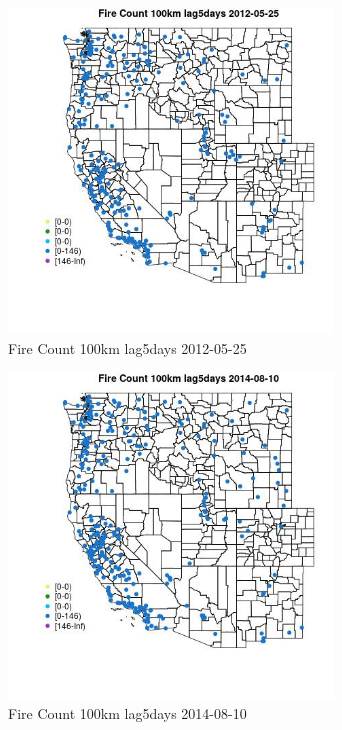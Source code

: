 \begin{figure} 
\centering  
\includegraphics[width=0.77\textwidth]{Code_Outputs/Report_ML_input_PM25_Step4_part_e_de_duplicated_aves_compiled_2019-05-18wNAs_MapObsFire_Count_100km_lag5days2012-05-25.jpg} 
\caption{\label{fig:Report_ML_input_PM25_Step4_part_e_de_duplicated_aves_compiled_2019-05-18wNAsMapObsFire_Count_100km_lag5days2012-05-25}Fire Count 100km lag5days 2012-05-25} 
\end{figure} 
 

\clearpage 

\begin{figure} 
\centering  
\includegraphics[width=0.77\textwidth]{Code_Outputs/Report_ML_input_PM25_Step4_part_e_de_duplicated_aves_compiled_2019-05-18wNAs_MapObsFire_Count_100km_lag5days2014-08-10.jpg} 
\caption{\label{fig:Report_ML_input_PM25_Step4_part_e_de_duplicated_aves_compiled_2019-05-18wNAsMapObsFire_Count_100km_lag5days2014-08-10}Fire Count 100km lag5days 2014-08-10} 
\end{figure} 
 

